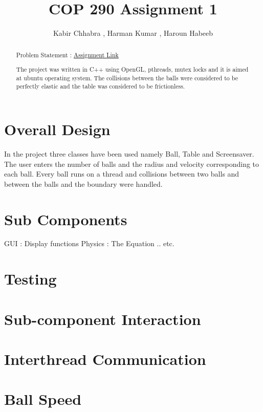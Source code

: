 \documentclass[]{article}
\begin{document}
\title{COP 290 Assignment 1}
\author{Kabir Chhabra , Harman Kumar , Haroun Habeeb}
\maketitle

\begin{abstract}
\begin{flushleft}
Problem Statement : \href { http://www.cse.iitd.ac.in/~prathmesh/ta/COP290/ass1.html }{Assignment Link}
\end{flushleft}

\begin{flushleft}
The project was written in C++ using OpenGL, pthreads, mutex locks and it is aimed at ubuntu operating system. The collisions between the balls were considered to be perfectly elastic and the table was considered to be frictionless.
\end{flushleft}

\end{abstract}

\section{Overall Design}
\begin{flushleft}
In the project three classes have been used namely Ball, Table and Screensaver. The user enters the number of balls and the radius and velocity corresponding to each ball. Every ball runs on a thread and collisions between two balls and between the balls and the boundary were handled.
\end{flushleft} 

\section{Sub Components}
\begin{flushleft}
GUI : Display functions
Physics : The Equation .. etc.

\end{flushleft}

\section{Testing}

\section{Sub-component Interaction}

\section{Interthread Communication}

\section{Ball Speed}
\end{document}
